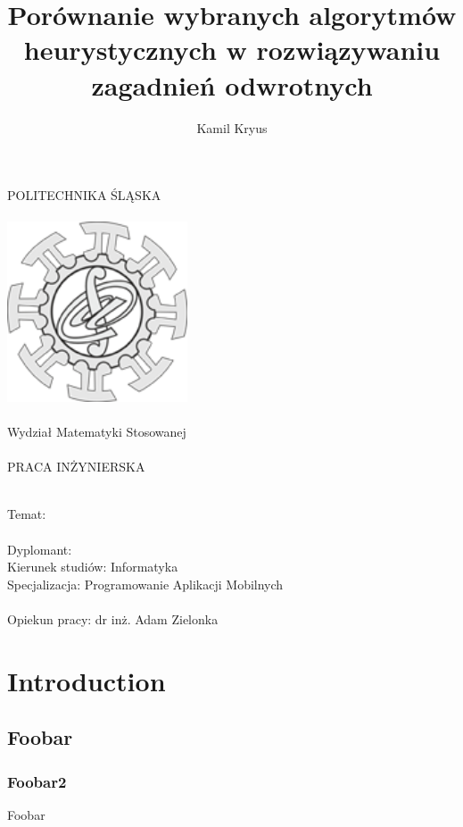 \documentclass{report}
\title{Porównanie wybranych algorytmów heurystycznych w rozwiązywaniu zagadnień odwrotnych}
\author{Kamil Kryus}
\newcommand{\newLine}{~\\}
\begin{document}
	\begin{titlepage}
		\begin{center}
			\Huge{\uppercase {POLITECHNIKA ŚLĄSKA}}\\ \newLine
			\bigbreak
			\includegraphics[width=0.4\textwidth]{logo}\\ \newLine
			\huge{Wydział Matematyki Stosowanej} \\ \newLine

			PRACA INŻYNIERSKA \\ \newLine
		\end{center}
			\LARGE{Temat: \@title} \\ \newLine
			Dyplomant: \@author \\
			Kierunek studiów: Informatyka \\
			Specjalizacja: Programowanie Aplikacji Mobilnych \\ \newLine
			Opiekun pracy: dr inż. Adam Zielonka \\
	\end{titlepage}
	\newpage
	\tableofcontents
	\newpage
	\chapter{Introduction}
		\section{Foobar}
			\subsection{Foobar2}
	Foobar
\end{document}
